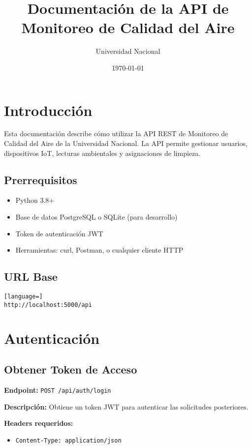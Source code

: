 \documentclass[12pt,a4paper]{article}
\title{Documentación de la API de Monitoreo de Calidad del Aire}
\author{Universidad Nacional}
\date{\today}
\begin{document}
\maketitle

\tableofcontents
\newpage

\section{Introducción}

Esta documentación describe cómo utilizar la API REST de Monitoreo de Calidad del Aire de la Universidad Nacional. La API permite gestionar usuarios, dispositivos IoT, lecturas ambientales y asignaciones de limpieza.

\subsection{Prerrequisitos}

\begin{itemize}
\item Python 3.8+
\item Base de datos PostgreSQL o SQLite (para desarrollo)
\item Token de autenticación JWT
\item Herramientas: curl, Postman, o cualquier cliente HTTP
\end{itemize}

\subsection{URL Base}
\begin{lstlisting}[language=]
http://localhost:5000/api
\end{lstlisting}

\section{Autenticación}

\subsection{Obtener Token de Acceso}

\textbf{Endpoint:} \texttt{POST /api/auth/login}

\textbf{Descripción:} Obtiene un token JWT para autenticar las solicitudes posteriores.

\textbf{Headers requeridos:}
\begin{itemize}
\item \texttt{Content-Type: application/json}
\end{itemize}
\end{document}
